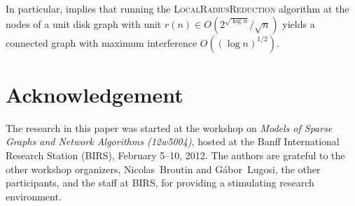 \documentclass{cccg12}
\begin{document}
In particular,  implies that running the
\textsc{LocalRadiusReduction} algorithm at the nodes of a unit disk graph
with unit $r(n)\in O(2^{\sqrt{\log n}}/\sqrt{n})$ yields a connected
graph with maximum interference $O((\log n)^{1/2})$.


\section*{Acknowledgement}

The research in this paper was started at the workshop on \emph{Models
of Sparse Graphs and Network Algorithms (12w5004)}, hosted at the Banff
International Research Station (BIRS), February 5--10, 2012.  The authors
are grateful to the other workshop organizers, Nicolas~Broutin and
G\'abor~Lugosi, the other participants, and the staff at BIRS, for
providing a stimulating research environment.



\end{document}
